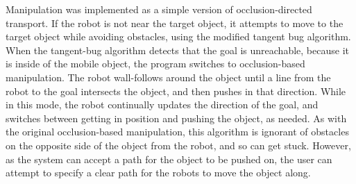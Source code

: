 Manipulation was implemented as a simple version of occlusion-directed transport. 
If the robot is not near the target object, it attempts to move to the target object while avoiding obstacles, using the modified tangent bug algorithm. 
When the tangent-bug algorithm detects that the goal is unreachable, because it is inside of the mobile object, the program switches to occlusion-based manipulation. 
The robot wall-follows around the object until a line from the robot to the goal intersects the object, and then pushes in that direction. 
While in this mode, the robot continually updates the direction of the goal, and switches between getting in position and pushing the object, as needed. 
As with the original occlusion-based manipulation, this algorithm is ignorant of obstacles on the opposite side of the object from the robot, and so can get stuck. 
However, as the system can accept a path for the object to be pushed on, the user can attempt to specify a clear path for the robots to move the object along. 

